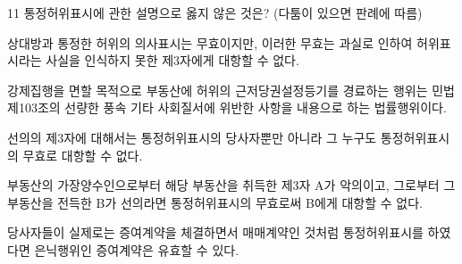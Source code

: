 \begin{question}{11}
통정허위표시에 관한 설명으로 옳지 않은 것은? (다툼이 있으면 판례에 따름)
\begin{choices}
  \item 상대방과 통정한 허위의 의사표시는 무효이지만, 이러한 무효는 과실로 인하여 허위표시라는 사실을 인식하지 못한 제3자에게 대항할 수 없다.
  \item 강제집행을 면할 목적으로 부동산에 허위의 근저당권설정등기를 경료하는 행위는 민법 제103조의 선량한 풍속 기타 사회질서에 위반한 사항을 내용으로 하는 법률행위이다.
  \item 선의의 제3자에 대해서는 통정허위표시의 당사자뿐만 아니라 그 누구도 통정허위표시의 무효로 대항할 수 없다.
  \item 부동산의 가장양수인으로부터 해당 부동산을 취득한 제3자 A가 악의이고, 그로부터 그 부동산을 전득한 B가 선의라면 통정허위표시의 무효로써 B에게 대항할 수 없다.
  \item 당사자들이 실제로는 증여계약을 체결하면서 매매계약인 것처럼 통정허위표시를 하였다면 은닉행위인 증여계약은 유효할 수 있다.
\end{choices}
\end{question}
